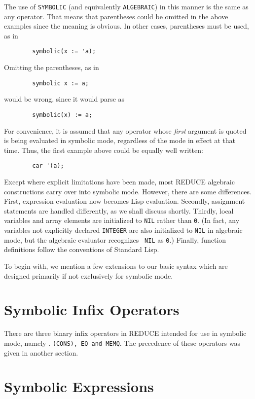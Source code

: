 \documentclass[11pt,letterpaper]{book}
\newcommand{\REDUCE}{REDUCE}
\begin{document}
The use of {\tt SYMBOLIC} (and equivalently {\tt ALGEBRAIC}) in this
manner is the same as any operator.  That means that parentheses could be
omitted in the above examples since the meaning is obvious.  In other
cases, parentheses must be used, as in

{\small\begin{verbatim}
        symbolic(x := 'a);
\end{verbatim}}
Omitting the parentheses, as in
{\small\begin{verbatim}
        symbolic x := a;
\end{verbatim}}
would be wrong, since it would parse as
{\small\begin{verbatim}
        symbolic(x) := a;
\end{verbatim}}
For convenience, it is assumed that any operator whose {\em first\/} argument is
quoted is being evaluated in symbolic mode, regardless of the mode in
effect at that time. Thus, the first example above could be equally well
written:
{\small\begin{verbatim}
        car '(a);
\end{verbatim}}
Except where explicit limitations have been made, most {\REDUCE} algebraic
constructions carry over into symbolic mode.
However, there are some differences.  First, expression evaluation now
becomes Lisp evaluation.  Secondly, assignment statements are handled
differently, as we shall discuss shortly.  Thirdly, local variables and array
elements are initialized to {\tt NIL} rather than {\tt 0}. (In fact, any
variables not explicitly declared {\tt INTEGER} are also initialized to
{\tt NIL} in algebraic mode, but the algebraic evaluator recognizes {\tt
NIL} as {\tt 0}.) Finally, function definitions follow the conventions of
Standard Lisp.

To begin with, we mention a few extensions to our basic syntax which are
designed primarily if not exclusively for symbolic mode.

\section{Symbolic Infix Operators}

There are three binary infix operators in {\REDUCE} intended for use in
symbolic mode, namely . {\tt (CONS), EQ and MEMQ}. The precedence of
these operators was given in another section.

\section{Symbolic Expressions}
\end{document}

